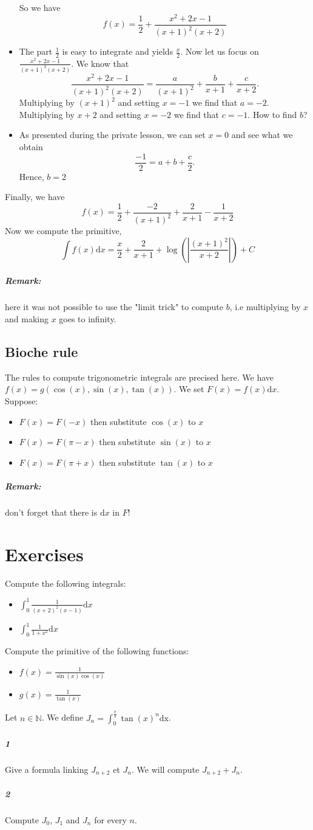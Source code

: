 \documentclass[10pt,a4paper]{article}
\begin{document}
\begin{itemize}
\begin{equation}
\end{equation}
So we have
\begin{equation}
f(x) = \frac{1}{2} + \frac{x^2+2x-1}{(x+1)^2(x+2)}
\end{equation}
\item The part $\frac{1}{2}$ is easy to integrate and yields $\frac{x}{2}$. Now let us focus on$\frac{x^2+2x-1}{(x+1)^2(x+2)}$. We know that
\begin{equation}
\frac{x^2+2x-1}{(x+1)^2(x+2)} = \frac{a}{(x+1)^2} + \frac{b}{x+1} + \frac{c}{x+2}.
\end{equation}
Multiplying by $(x+1)^2$ and setting $x = -1$ we find that $a = -2$. Multiplying by $x+2$ and setting $x=-2$ we find that $c = -1$. How to find $b$?
\item As presented during the private lesson, we can set $x=0$ and see what we obtain
\begin{equation}
\frac{-1}{2} = a +b + \frac{c}{2}.
\end{equation}
Hence, $b= 2$
\end{itemize}
Finally, we have
\begin{equation}
f(x) = \frac{1}{2} + \frac{-2}{(x+1)^2} + \frac{2}{x+1} - \frac{1}{x+2}
\end{equation}
Now we compute the primitive,
\begin{equation}
\int f(x) \text{d}x = \frac{x}{2} +\frac{2}{x+1} + \log \left( \left| \frac{(x+1)^2}{x+2}\right|\right) + C
\end{equation}
\subparagraph{Remark:} here it was not possible to use the "limit trick" to compute $b$, i.e multiplying by $x$ and making $x$ goes to infinity.
\subsection{Bioche rule}
The rules to compute trigonometric integrals are precised here. We have $f(x) = g(\cos(x), \sin(x), \tan(x))$. We set $F(x) = f(x) \text{d}x$. Suppose:
\begin{itemize}
\item $F(x) = F(-x)$ then substitute $\cos(x)$ to $x$
\item $F(x) = F(\pi-x)$ then substitute $\sin(x)$ to $x$
\item $F(x) = F(\pi+x)$ then substitute $\tan(x)$ to $x$
\end{itemize}
\subparagraph{Remark:} don't forget that there is $\text{d}x$ in $F$!
\section{Exercises}
Compute the following integrals:
\begin{itemize}
\item $\int_0^1 \frac{1}{(x+2)^2(x-1)} \text{d}x$
\item $\int_0^1 \frac{1}{1+x^2} \text{d}x$
\end{itemize}
Compute the primitive of the following functions:
\begin{itemize}
\item $f(x) = \frac{1}{\sin(x) \cos(x)}$
\item $g(x) = \frac{1}{\tan(x)}$
\end{itemize}

Let $n \in \mathbb{N}$. We define $J_n=\int_{0}^{\frac{\pi}{4}} \tan(x)^n \text{dx}$.
\subparagraph{1}Give a formula linking $J_{n+2}$ et $J_{n}$. We will compute $J_{n+2}+J_n$.
\subparagraph{2}Compute $J_0$, $J_1$ and $J_n$ for every $n$.
\end{document}
